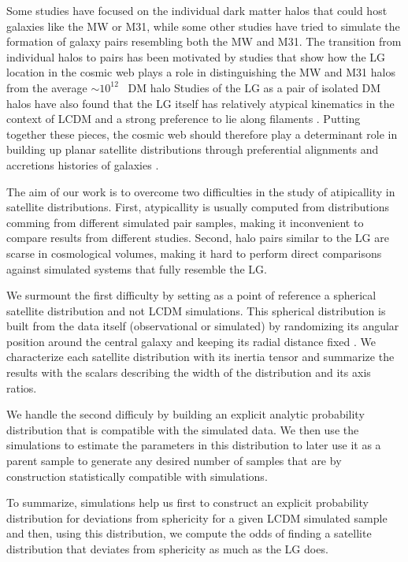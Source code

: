 \documentclass[a4paper,fleqn,usenatbib]{mnras}
\newcommand{\Msun}{{\ifmmode{{\rm{M_{\odot}}}}\else{${\rm{M_{\odot}}}$}\fi}}
\begin{document}
Some studies have focused on the individual dark matter halos
that could host galaxies like the MW or M31, while some other studies
have tried to simulate the formation of galaxy pairs resembling both
the MW and M31.
The transition from individual halos to pairs has been
motivated by studies that show how the LG location in the cosmic web
plays a role in distinguishing the MW and M31 halos from the
average $\sim 10^{12}$ \Msun\ DM halo \citep{2011MNRAS.417.1434F}
Studies of the LG as a pair of isolated DM halos have also found that
the LG itself has relatively atypical kinematics in the context
of LCDM and a strong preference to lie along filaments \citep{ForeroRomero2013}.
Putting together these pieces, the cosmic web should therefore play a
determinant role in building up planar satellite distributions through
preferential alignments and accretions histories of galaxies
\citep{2014MNRAS.443.1090F}.  

The aim of our work is to overcome two difficulties in the study of
atipicallity in satellite distributions.
First, atypicallity is usually computed from distributions comming from
different simulated pair samples, making it inconvenient to compare
results from different studies. 
Second, halo pairs similar to the LG are scarse in cosmological
volumes, making it hard to perform direct comparisons against simulated
systems that fully resemble the LG. 

We surmount the first difficulty by setting as a point of reference a
spherical satellite distribution and not LCDM simulations.
This spherical distribution is built from the data itself
(observational or simulated) by randomizing its angular position
around the central galaxy and keeping its radial distance fixed
\citep{2017AN....338..854P}. 
We characterize each satellite distribution with its inertia
tensor and summarize the results with the scalars describing the width
of the distribution and its axis ratios.

We handle the second difficuly by building an explicit analytic
probability distribution that is compatible with the simulated data.
We then use the simulations to estimate the parameters in this
distribution to later use it as a parent sample to generate any
desired number of samples that are by construction statistically
compatible with simulations.

To summarize, simulations help us first to construct an explicit probability
distribution for deviations from sphericity for a given LCDM simulated
sample and then, using this distribution, we compute the odds of finding a satellite
distribution that deviates from sphericity as much as the LG does.   
\end{document}
